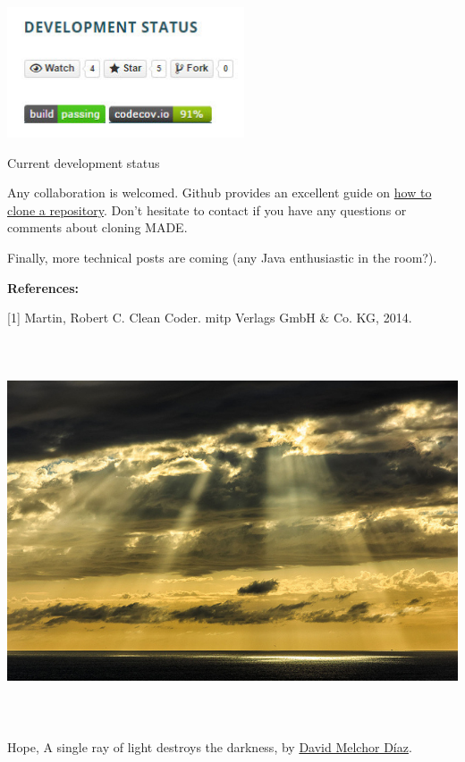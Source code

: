 \documentclass[a4paper]{article}
\begin{document}
\href{http://www.velonuboso.com/made/blog/wp-content/uploads/2015/06/Chrome-Legacy-Window-16062015-190918.jpg}{
\includegraphics[width=7.011cm,height=3.863cm]{makingofmade113-img5.jpg}
}

Current development status
~

Any collaboration is welcomed. Github provides an excellent guide on
\href{https://help.github.com/articles/cloning-a-repository/}{how to
clone a repository}. Don{\textquoteright}t hesitate to contact if you
have any questions or comments about cloning MADE.

Finally, more technical posts are coming (any Java enthusiastic in the
room?).

{\bfseries
References:}

[1] Martin, Robert C. Clean Coder. mitp Verlags GmbH \& Co. KG, 2014.

\href{http://www.velonuboso.com/made/blog/wp-content/uploads/2015/06/10825776773_402fc0e070_z.jpg}{
\includegraphics[width=16.986cm,height=11.351cm]{makingofmade113-img6.jpg}
}

Hope, A single ray of light destroys the darkness, by
\href{https://www.flickr.com/photos/dmelchordiaz/}{David Melchor
D\'iaz}.
\end{document}
